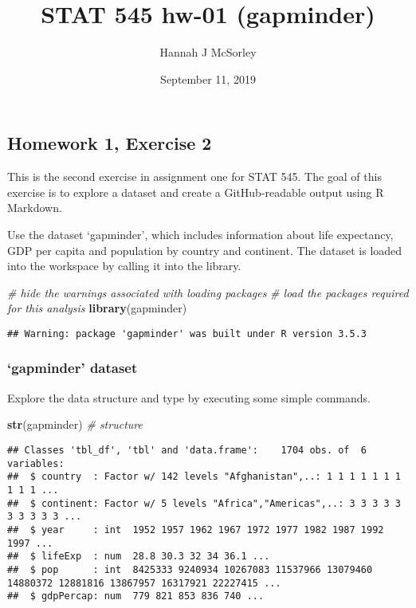 \documentclass[]{article}
\title{STAT 545 hw-01 (gapminder)}
\author{Hannah J McSorley}
\date{September 11, 2019}
\newenvironment{Shaded}{\begin{snugshade}}{\end{snugshade}}
\newcommand{\KeywordTok}[1]{\textcolor[rgb]{0.13,0.29,0.53}{\textbf{#1}}}
\newcommand{\CommentTok}[1]{\textcolor[rgb]{0.56,0.35,0.01}{\textit{#1}}}
\newcommand{\NormalTok}[1]{#1}
\begin{document}
\maketitle

\subsection{Homework 1, Exercise 2}\label{homework-1-exercise-2}

This is the second exercise in assignment one for STAT 545. The goal of
this exercise is to explore a dataset and create a GitHub-readable
output using R Markdown.

Use the dataset `gapminder', which includes information about life
expectancy, GDP per capita and population by country and continent. The
dataset is loaded into the workspace by calling it into the library.

\begin{Shaded}
\begin{Highlighting}[]
\CommentTok{# hide the warnings associated with loading packages}
\CommentTok{# load the packages required for this analysis}
\KeywordTok{library}\NormalTok{(gapminder)}
\end{Highlighting}
\end{Shaded}

\begin{verbatim}
## Warning: package 'gapminder' was built under R version 3.5.3
\end{verbatim}

\subsubsection{\texorpdfstring{`gapminder'
dataset}{gapminder dataset}}\label{gapminder-dataset}

Explore the data structure and type by executing some simple commands.

\begin{Shaded}
\begin{Highlighting}[]
\KeywordTok{str}\NormalTok{(gapminder)  }\CommentTok{# structure}
\end{Highlighting}
\end{Shaded}

\begin{verbatim}
## Classes 'tbl_df', 'tbl' and 'data.frame':    1704 obs. of  6 variables:
##  $ country  : Factor w/ 142 levels "Afghanistan",..: 1 1 1 1 1 1 1 1 1 1 ...
##  $ continent: Factor w/ 5 levels "Africa","Americas",..: 3 3 3 3 3 3 3 3 3 3 ...
##  $ year     : int  1952 1957 1962 1967 1972 1977 1982 1987 1992 1997 ...
##  $ lifeExp  : num  28.8 30.3 32 34 36.1 ...
##  $ pop      : int  8425333 9240934 10267083 11537966 13079460 14880372 12881816 13867957 16317921 22227415 ...
##  $ gdpPercap: num  779 821 853 836 740 ...
\end{verbatim}
\end{document}
